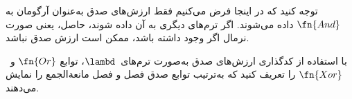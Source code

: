 \documentclass[../../../include/open-logic-section]{subfiles}
\begin{document}
توجه کنید که در اینجا فرض می‌کنیم فقط ارزش‌های صدق به‌عنوان آرگومان به
$\fn{And}$ داده می‌شوند. اگر ترم‌های دیگری به آن داده شوند، حاصل، یعنی
صورت نرمال اگر وجود داشته باشد، ممکن است ارزش صدق نباشد.

\begin{prob}
  با استفاده از کدگذاری ارزش‌های صدق به‌صورت ترم‌های~$\lambd$، توابع
  $\fn{Or}$ و~$\fn{Xor}$ را تعریف کنید که به‌ترتیب توابع صدق فصل و فصل
  مانعةالجمع را نمایش می‌دهند.
\end{prob}
\end{document}
